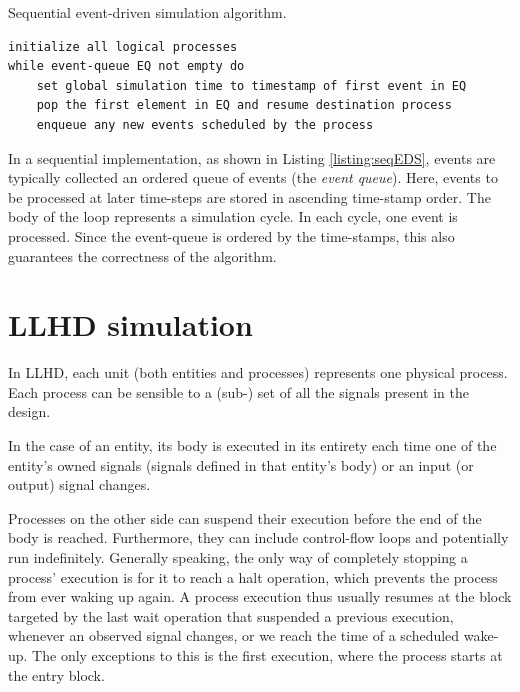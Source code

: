 \begin{listing}[ht]
    \caption{Sequential event-driven simulation algorithm.}
    \label{listing:seqEDS}
    \begin{verbatim}
initialize all logical processes
while event-queue EQ not empty do
    set global simulation time to timestamp of first event in EQ
    pop the first element in EQ and resume destination process
    enqueue any new events scheduled by the process
    \end{verbatim}
\end{listing}

In a sequential implementation, as shown in Listing \ref{listing:seqEDS}, events are typically collected an ordered queue of events (the \textit{event queue}). Here, events to be processed at later time-steps are stored in ascending time-stamp order. The body of the loop represents a simulation cycle. In each cycle, one event is processed. Since the event-queue is ordered by the time-stamps, this also guarantees the correctness of the algorithm.


\section{LLHD simulation}
In LLHD, each unit (both entities and processes) represents one physical process. Each process can be sensible to a (sub-) set of all the signals present in the design.

In the case of an entity, its body is executed in its entirety each time one of the entity's owned signals (signals defined in that entity's body) or an input (or output) signal changes.

Processes on the other side can suspend their execution before the end of the body is reached. Furthermore, they can include control-flow loops and potentially run indefinitely. Generally speaking, the only way of completely stopping a process' execution is for it to reach a halt operation, which prevents the process from ever waking up again. A process execution thus usually resumes at the block targeted by the last wait operation that suspended a previous execution, whenever an observed signal changes, or we reach the time of a scheduled wake-up. The only exceptions to this is the first execution, where the process starts at the entry block.

